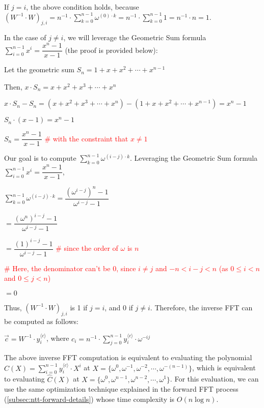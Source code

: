 If $j = i$, the above condition holds, because $(W^{-1} \cdot W)_{j, i} = n^{-1}\cdot\sum\limits_{k=0}^{n-1}\omega^{(0)\cdot k} =  n^{-1}\cdot\sum\limits_{k=0}^{n-1}1 = n^{-1} \cdot n = 1$. 

In the case of $j \neq i$, we will leverage the Geometric Sum formula $\sum\limits_{i=0}^{n-1}x^i = \dfrac{x^n - 1}{x - 1}$ (the proof is provided below):


\begin{tcolorbox}[title={\textbf{\tboxtheorem{\ref*{subsec:ntt-backward}} Geometric Sum Formula}}]

Let the geometric sum $S_n = 1 + x + x^2 + \cdots + x^{n - 1}$

Then, $x \cdot S_n = x + x^2 + x^3 + \cdots + x^{n}$

$x \cdot S_n - S_n = (x + x^2 + x^3 + \cdots + x^{n}) - (1 + x + x^2 + \cdots + x^{n - 1}) = x^n - 1$

$S_n\cdot (x - 1) = x^n - 1$

$S_n = \dfrac{x^n - 1}{x - 1}$ \textcolor{red}{ \# with the constraint that $x \neq 1$}

\end{tcolorbox}

Our goal is to compute $\sum\limits_{k=0}^{n-1}\omega^{(i-j)\cdot k}$. Leveraging the Geometric Sum formula $\sum\limits_{i=0}^{n-1}x^i = \dfrac{x^n - 1}{x - 1}$, 

$\sum\limits_{k=0}^{n-1}\omega^{(i-j)\cdot k} = \dfrac{(\omega^{i - j})^n - 1}{\omega^{i - j} - 1}$ 

$= \dfrac{(\omega^n)^{i - j} - 1}{\omega^{i - j} - 1}$

$= \dfrac{(1)^{i - j} - 1}{\omega^{i - j} - 1}$ \textcolor{red}{ \# since the order of $\omega$ is $n$}

\textcolor{red}{ \# Here, the denominator can't be 0, since $i \neq j$ and $-n < i - j < n$ (as $0 \leq i < n$ and $0 \leq j < n$)}

$= 0$

Thus, $(W^{-1} \cdot W)_{j, i}$ is 1 if $j = i$, and 0 if $j \neq i$. Therefore, the inverse FFT can be computed as follows:


$\vec{c} = W^{-1} \cdot y_i^{\langle c \rangle}$, \text{ } where $c_i = n^{-1}\cdot \sum\limits_{j=0}^{n-1}{y}_i^{\langle c \rangle} \cdot \omega^{-ij}$

The above inverse FFT computation is equivalent to evaluating the polynomial $\hat{C}(X) = \sum\limits_{i=0}^{n-1} y_i^{\langle c \rangle} \cdot X^i$ at $X = \{\omega^{0}, \omega^{-1}, \omega^{-2}, \cdots,  \omega^{-(n-1)}\}$, which is equivalent to evaluating $\hat{C}(X)$ at $X = \{\omega^{0}, \omega^{n-1}, \omega^{n-2}, \cdots, \omega^1\}$. For this evaluation, we can use the same optimization technique explained in the forward FFT process (\autoref{subsec:ntt-forward-details}) whose time complexity is $O(n \log n)$.

